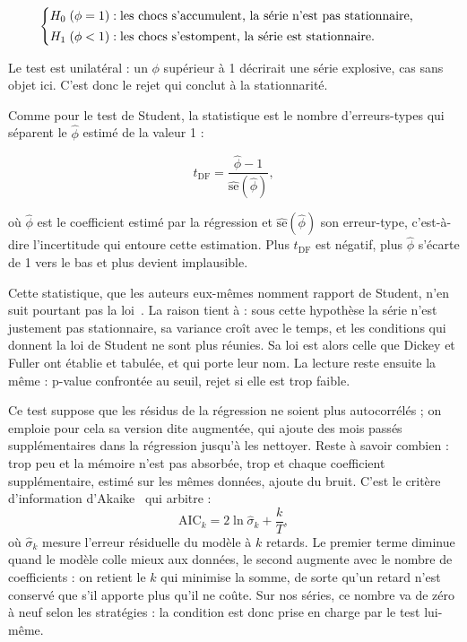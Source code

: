 \[
  \begin{cases}
    H_0 \;(\phi = 1) : \text{les chocs s'accumulent, la série n'est pas stationnaire,}\\[2pt]
    H_1 \;(\phi < 1) : \text{les chocs s'estompent, la série est stationnaire.}
  \end{cases}
\]

Le test est unilatéral : un \(\phi\) supérieur à 1 décrirait une série
explosive, cas sans objet ici. C'est donc le rejet qui conclut à la
stationnarité.

Comme pour le test de Student, la statistique est le nombre d'erreurs-types
qui séparent le \(\hat\phi\) estimé de la valeur 1 :

\[
  t_{\mathrm{DF}} = \frac{\hat\phi - 1}{\widehat{\mathrm{se}}(\hat\phi)},
\]


où \(\hat\phi\) est le coefficient estimé par la régression et
\(\widehat{\mathrm{se}}(\hat\phi)\) son erreur-type, c'est-à-dire
l'incertitude qui entoure cette estimation. Plus \(t_{\mathrm{DF}}\) est
négatif, plus \(\hat\phi\) s'écarte de 1 vers le bas et plus \Hzero{} devient
implausible.

Cette statistique, que les auteurs eux-mêmes nomment rapport de Student, n'en
suit pourtant pas la loi~\cite{dickeyfuller1979}. La raison tient à \Hzero{} :
sous cette hypothèse la série n'est justement pas stationnaire, sa variance
croît avec le temps, et les conditions qui donnent la loi de Student ne sont
plus réunies. Sa loi est alors celle que Dickey et Fuller ont établie et
tabulée, et qui porte leur nom. La lecture reste ensuite la même :
p-value confrontée au seuil, rejet si elle est trop faible.

Ce test suppose que les résidus de la régression ne soient
plus autocorrélés ; on emploie pour cela sa version dite augmentée, qui
ajoute des mois passés supplémentaires dans la régression jusqu'à les
nettoyer. Reste à savoir combien : trop peu et la mémoire n'est pas absorbée,
trop et chaque coefficient supplémentaire, estimé sur les mêmes données,
ajoute du bruit. C'est le critère d'information d'Akaike~\cite{akaike1974}
qui arbitre :
\[
  \mathrm{AIC}_k = 2\ln \hat\sigma_k + \frac{k}{T},
\]
où \(\hat\sigma_k\) mesure l'erreur résiduelle du modèle à \(k\) retards.
Le premier terme diminue quand le modèle colle mieux aux données, le second
augmente avec le nombre de coefficients : on retient le \(k\) qui minimise
la somme, de sorte qu'un retard n'est conservé que s'il apporte plus qu'il
ne coûte. Sur nos séries, ce nombre va de zéro à neuf selon les stratégies :
la condition est donc prise en charge par le test lui-même.

